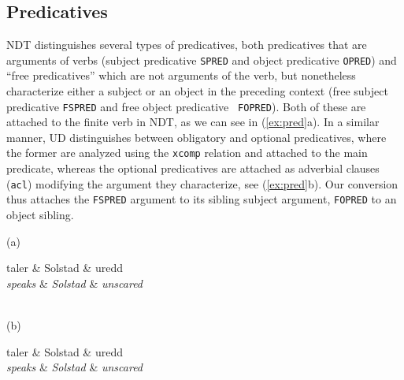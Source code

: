 \documentclass[10pt, a4paper]{article}
\let\w=\emph
\begin{document}
\subsection{Predicatives}
NDT distinguishes several types of predicatives, both predicatives
that are arguments of verbs (subject predicative {\tt SPRED} and
object predicative {\tt OPRED}) and ``free predicatives'' which are
not arguments of the verb, but nonetheless characterize either a
subject or an object in the preceding context (free subject
predicative {\tt FSPRED} and free object predicative {\tt
  FOPRED}). Both of these are attached to the finite verb in NDT, as we can see in (\ref{ex:pred}a). In a
similar manner, UD distinguishes between obligatory and optional
predicatives, where the former are analyzed using the {\tt xcomp}
relation and attached to the main predicate, whereas the optional
predicatives are attached as adverbial clauses ({\tt acl}) modifying the argument
they characterize, see (\ref{ex:pred}b). Our conversion thus attaches the {\tt FSPRED} argument to its sibling subject argument, {\tt FOPRED} to an object sibling.
\begin{examples}
\item\label{ex:pred}
(a)\\
    \begin{dependency}
        \begin{deptext}[column sep=.2cm]
          taler \& Solstad \& uredd \\
          \w{speaks} \& \w{Solstad} \& \w{unscared} \\
        \end{deptext}
    \end{dependency}
\\(b)\\
    \begin{dependency}
        \begin{deptext}[column sep=.2cm]
          taler \& Solstad \& uredd \\
          \w{speaks} \& \w{Solstad} \& \w{unscared} \\
        \end{deptext}
    \end{dependency}
\end{examples}
\end{document}
